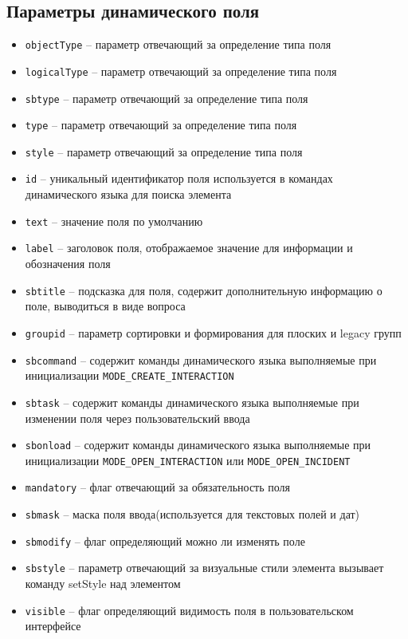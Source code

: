 \documentclass[../index.tex]{subfiles}
\begin{document}
\subsection{Параметры динамического поля}
\begin{itemize}
    \item \verb|objectType| -- параметр отвечающий за определение типа поля
    \item \verb|logicalType| -- параметр отвечающий за определение типа поля
    \item \verb|sbtype| -- параметр отвечающий за определение типа поля
    \item \verb|type| -- параметр отвечающий за определение типа поля
    \item \verb|style| -- параметр отвечающий за определение типа поля
    \item \verb|id| -- уникальный идентификатор поля используется в командах динамического языка для поиска элемента
    \item \verb|text| -- значение поля по умолчанию
    \item \verb|label| -- заголовок поля, отображаемое значение для информации и обозначения поля
    \item \verb|sbtitle| -- подсказка для поля, содержит дополнительную информацию о поле, выводиться в виде вопроса
    \item \verb|groupid| -- параметр сортировки и формирования для плоских и legacy групп
    \item \verb|sbcommand| -- содержит команды динамического языка выполняемые при инициализации \verb|MODE_CREATE_INTERACTION|
    \item \verb|sbtask| -- содержит команды динамического языка выполняемые при изменении поля через пользовательский ввода
    \item \verb|sbonload| -- содержит команды динамического языка выполняемые при инициализации \verb|MODE_OPEN_INTERACTION| или \verb|MODE_OPEN_INCIDENT|
    \item \verb|mandatory| -- флаг отвечающий за обязательность поля
    \item \verb|sbmask| -- маска поля ввода(используется для текстовых полей и дат)
    \item \verb|sbmodify| -- флаг определяющий можно ли изменять поле
    \item \verb|sbstyle| -- параметр отвечающий за визуальные стили элемента вызывает команду setStyle над элементом
    \item \verb|visible| -- флаг определяющий видимость поля в пользовательском интерфейсе

\end{itemize}
\end{document}
